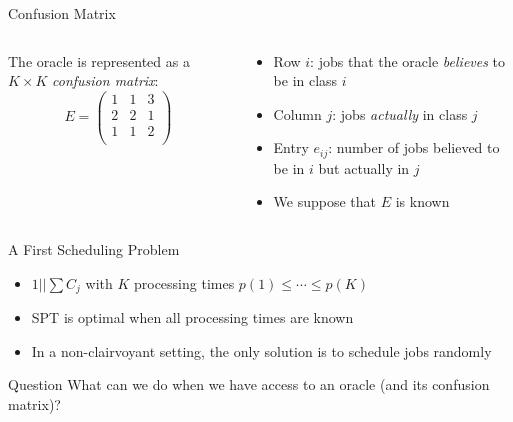 \documentclass[aspectratio=169]{beamer}
\begin{document}
\begin{frame}{Confusion Matrix}

\begin{columns}
    \begin{column}{.5\textwidth}
        The oracle is represented as a \(K\times K\) \emph{confusion matrix}:
        \[
            E=\begin{pmatrix}
                1 & 1 & 3 \\
                2 & 2 & 1 \\
                1 & 1 & 2 \\
            \end{pmatrix}
        \]
    \end{column}
    \begin{column}{.5\textwidth}
        \begin{itemize}
            \item Row \(i\): jobs that the oracle \emph{believes} to be in class \(i\)
            \item Column \(j\): jobs \emph{actually} in class \(j\)
            \item Entry \(e_{ij}\): number of jobs believed to be in \(i\) but actually in \(j\)
            \item We suppose that \(E\) is known
        \end{itemize}
    \end{column}
\end{columns}

\end{frame}


\begin{frame}{A First Scheduling Problem}

\begin{itemize}
    \item \(1||\sum C_j\) with \(K\) processing times \(p(1)\le\cdots\le p(K)\)
    \item SPT is optimal when all processing times are known
    \item In a non-clairvoyant setting, the only solution is to schedule jobs randomly
\end{itemize}

\vspace{20pt}

\begin{block}{Question}
    What can we do when we have access to an oracle (and its confusion matrix)?
\end{block}

\end{frame}
\end{document}
